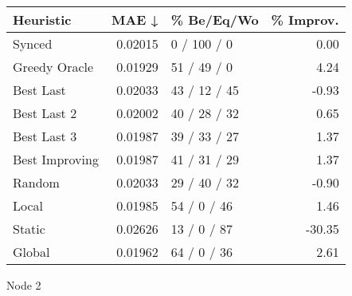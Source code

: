 \begin{tabular}{lrlr}
\toprule
\textbf{Heuristic} & \textbf{MAE ↓} & \textbf{\% Be/Eq/Wo} & \textbf{\% Improv.} \\
\midrule
            Synced &        0.02015 &          0 / 100 / 0 &                0.00 \\
     Greedy Oracle &        0.01929 &          51 / 49 / 0 &                4.24 \\
         Best Last &        0.02033 &         43 / 12 / 45 &               -0.93 \\
       Best Last 2 &        0.02002 &         40 / 28 / 32 &                0.65 \\
       Best Last 3 &        0.01987 &         39 / 33 / 27 &                1.37 \\
    Best Improving &        0.01987 &         41 / 31 / 29 &                1.37 \\
            Random &        0.02033 &         29 / 40 / 32 &               -0.90 \\
             Local &        0.01985 &          54 / 0 / 46 &                1.46 \\
            Static &        0.02626 &          13 / 0 / 87 &              -30.35 \\
            Global &        0.01962 &          64 / 0 / 36 &                2.61 \\
\bottomrule
\end{tabular}
\caption{Node 2}
\label{tab:iid_lr01_le2_bs2_2}
